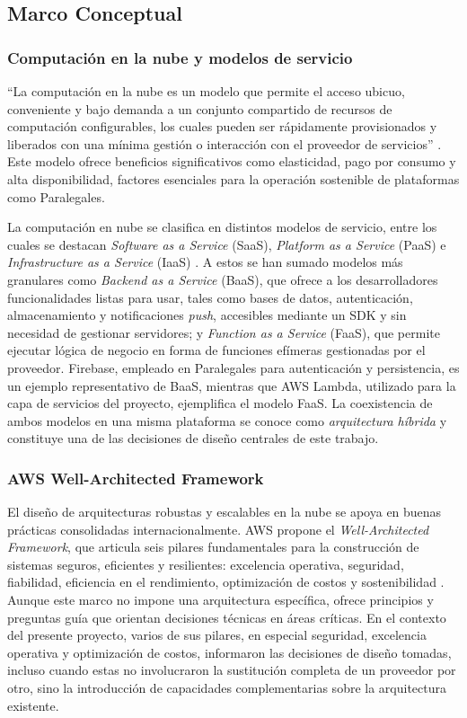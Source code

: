 \subsection{Marco Conceptual}

\subsubsection{Computación en la nube y modelos de servicio}

``La computación en la nube es un modelo que permite el acceso ubicuo, conveniente y bajo demanda a un conjunto compartido de recursos de computación configurables, los cuales pueden ser rápidamente provisionados y liberados con una mínima gestión o interacción con el proveedor de servicios'' \cite{Mell2011}. Este modelo ofrece beneficios significativos como elasticidad, pago por consumo y alta disponibilidad, factores esenciales para la operación sostenible de plataformas como Paralegales.

La computación en nube se clasifica en distintos modelos de servicio, entre los cuales se destacan \textit{Software as a Service} (SaaS), \textit{Platform as a Service} (PaaS) e \textit{Infrastructure as a Service} (IaaS) \cite{Mell2011}. A estos se han sumado modelos más granulares como \textit{Backend as a Service} (BaaS), que ofrece a los desarrolladores funcionalidades listas para usar, tales como bases de datos, autenticación, almacenamiento y notificaciones \textit{push}, accesibles mediante un SDK y sin necesidad de gestionar servidores; y \textit{Function as a Service} (FaaS), que permite ejecutar lógica de negocio en forma de funciones efímeras gestionadas por el proveedor. Firebase, empleado en Paralegales para autenticación y persistencia, es un ejemplo representativo de BaaS, mientras que AWS Lambda, utilizado para la capa de servicios del proyecto, ejemplifica el modelo FaaS. La coexistencia de ambos modelos en una misma plataforma se conoce como \textit{arquitectura híbrida} y constituye una de las decisiones de diseño centrales de este trabajo.

\subsubsection{AWS Well-Architected Framework}

El diseño de arquitecturas robustas y escalables en la nube se apoya en buenas prácticas consolidadas internacionalmente. AWS propone el \textit{Well-Architected Framework}, que articula seis pilares fundamentales para la construcción de sistemas seguros, eficientes y resilientes: excelencia operativa, seguridad, fiabilidad, eficiencia en el rendimiento, optimización de costos y sostenibilidad \cite{AWS2024}. Aunque este marco no impone una arquitectura específica, ofrece principios y preguntas guía que orientan decisiones técnicas en áreas críticas. En el contexto del presente proyecto, varios de sus pilares, en especial seguridad, excelencia operativa y optimización de costos, informaron las decisiones de diseño tomadas, incluso cuando estas no involucraron la sustitución completa de un proveedor por otro, sino la introducción de capacidades complementarias sobre la arquitectura existente.

